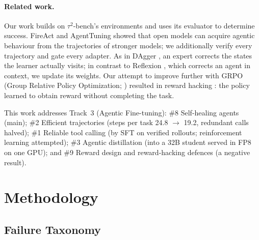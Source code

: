 \documentclass[11pt]{article}
\begin{document}
\paragraph{Related work.}\label{sec:related_work} Our work builds on $\tau^2$-bench's environments and uses its evaluator to determine success. FireAct \citep{Chen2023FireAct} and AgentTuning \citep{Zeng2023AgentTuning} showed that open models can acquire agentic behaviour from the trajectories of stronger models; we additionally verify every trajectory and gate every adapter. As in DAgger \citep{Ross2011DAgger}, an expert corrects the states the learner actually visits; in contrast to Reflexion \citep{Shinn2023Reflexion}, which corrects an agent in context, we update its weights. Our attempt to improve further with GRPO (Group Relative Policy Optimization; \citealp{Shao2024DeepSeekMath}) resulted in reward hacking \citep{Skalse2022RewardHacking}: the policy learned to obtain reward without completing the task.

This work addresses Track~3 (Agentic Fine-tuning): \#8 Self-healing agents (main); \#2 Efficient trajectories (steps per task 24.8 $\rightarrow$ 19.2, redundant calls halved); \#1 Reliable tool calling (by SFT on verified rollouts; reinforcement learning attempted); \#3 Agentic distillation (into a 32B student served in FP8 on one GPU); and \#9 Reward design and reward-hacking defences (a negative result).

\section{Methodology}
\label{sec:method}

\subsection{Failure Taxonomy}
\label{sec:method_taxonomy}
\end{document}
